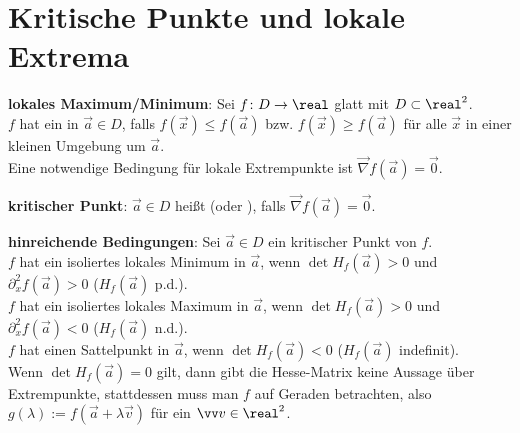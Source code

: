 \pagebreak

\section{%
    Kritische Punkte und lokale Extrema%
}

\textbf{lokales Maximum/Minimum}:
Sei $f\colon D \to \real$ glatt mit $D \subset \real^2$.\\
$f$ hat ein  in $\vec{a} \in D$, falls
$f(\vec{x}) \le f(\vec{a})$ bzw. $f(\vec{x}) \ge f(\vec{a})$ für alle $\vec{x}$ in einer
kleinen Umgebung um $\vec{a}$.\\
Eine notwendige Bedingung für lokale Extrempunkte ist $\vec{\nabla} f(\vec{a}) = \vec{0}$.

\textbf{kritischer Punkt}:
$\vec{a} \in D$ heißt  (oder ), falls
$\vec{\nabla} f(\vec{a}) = \vec{0}$.

\textbf{hinreichende Bedingungen}:
Sei $\vec{a} \in D$ ein kritischer Punkt von $f$.\\
$f$ hat ein isoliertes lokales Minimum in $\vec{a}$, wenn $\det H_f(\vec{a}) > 0$ und
$\partial_x^2 f(\vec{a}) > 0$ ($H_f(\vec{a})$ p.d.).\\
$f$ hat ein isoliertes lokales Maximum in $\vec{a}$, wenn $\det H_f(\vec{a}) > 0$ und
$\partial_x^2 f(\vec{a}) < 0$ ($H_f(\vec{a})$ n.d.).\\
$f$ hat einen Sattelpunkt in $\vec{a}$, wenn $\det H_f(\vec{a}) < 0$ ($H_f(\vec{a})$ indefinit).\\
Wenn $\det H_f(\vec{a}) = 0$ gilt, dann gibt die Hesse-Matrix keine Aussage über Extrempunkte,
stattdessen muss man $f$ auf Geraden betrachten, also $g(\lambda) := f(\vec{a} + \lambda \vec{v})$
für ein $\vec{v} \in \real^2$.

\linie

